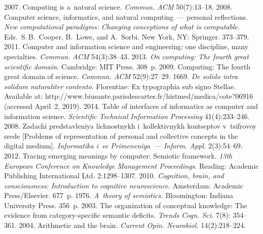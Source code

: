 \begin{multicols}{2}
{{\begin{thebibliography}{99}
 2007. Computing is a~natural science. \textit{Commun. 
ACM} 50(7):13--18.
 2008. Computer science, informatics, and natural computing~--- 
personal reflections. \textit{New computational paradigms: Changing conceptions of 
what is computable}. Eds.\ S.\,B.~Cooper, B.~L$\ddot{\mbox{o}}$we, and A.~Sorbi.
New York, NY: Springer. 373--379.
 2011. Computer and information science and engineering: one 
discipline, many specialties. \textit{Commun.  ACM} 54(3):38--43.
 2013. \textit{On computing: The fourth great scientific 
domain.} Cambridge: MIT Press. 308~p.
 2009. Computing: The fourth great domain 
of science. \textit{Commun. ACM} 52(9):27--29.
 1669. \textit{De solido intra solidum naturaliter contento}. 
Florentiae: Ex typographia sub signo Stellae. Available at: {\sf 
http://www.biusante.parisdescartes.fr/histmed/\linebreak medica/cote?06916} (accessed 
April~2, 2019).
 2014. Table of interfaces of informatics as computer and 
information science. \textit{Scientific Technical Information Processing} 
41(4):233--246.
 2008. Zadachi predstavleniya 
lichnostnykh i~kollektivnykh kontseptov v~tsifrovoy srede [Problems of 
representation of personal and collective concepts in the digital medium]. 
\textit{Informatika i~ee Primeneniya~--- Inform. Appl.} 2(3):54--69.
 2012. Tracing emerging meanings by computer: Semiotic 
framework. \textit{13th European Conference on Knowledge Management 
Proceedings}. Reading: Academic Publishing International Ltd. 2:1298--1307.
 2010. \textit{Cognition, brain, and consciousness: 
Introduction to cognitive neuroscience.} Amsterdam: Academic Press/Elsevier. 
677~p.
 1976. \textit{A~theory of semiotics.} Bloomington: Indiana University 
Press. 356~p.
 2003. The organization of conceptual 
knowledge: The evidence from category-specific semantic deficits. \textit{Trends  
Cogn. Sci.} 7(8): 354--361.
 2004. Arithmetic and 
the brain. \textit{Current Opin. Neurobiol.} 14(2):218--224.


\end{thebibliography}}}
\end{multicols}
